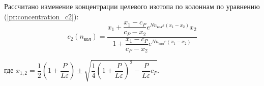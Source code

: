 
Рассчитано изменение концентрации целевого изотопа по колоннам по уравнению (\ref{pr:concentration_c2}):
\begin{equation}\label{pr:concentration_c2}
    c_{2}(n_{\text{кол}}) = \dfrac{x_{1} + \dfrac{x_{1} - c_{P}}{c_{P} - x_{2}} e^{Nn_{\text{кол}}\varepsilon (x_{1} - x_{2})}x_{2}}{1 + \dfrac{x_{1} - c_{P}}{c_{P} - x_{2}} e^{Nn_{\text{кол}}\varepsilon (x_{1} - x_{2})}}
\end{equation}

\noindent где $x_{1,2} = \dfrac{1}{2}(1 + \dfrac{P}{L\varepsilon})\pm \sqrt{\dfrac{1}{4}(1 + \dfrac{P}{L\varepsilon})^{2} - \dfrac{P}{L\varepsilon}c_{P}}.$

